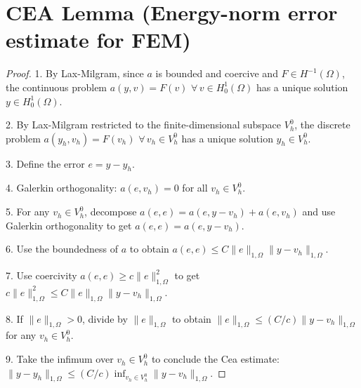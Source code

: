 \documentclass[12pt]{article}
\begin{document}
\section*{CEA Lemma (Energy-norm error estimate for FEM)}

\begin{proof}
1. By Lax-Milgram, since $a$ is bounded and coercive and $F \in H^{-1}(\Omega)$, the continuous problem $a(y, v) = F(v)$ $\forall\, v \in H^1_0(\Omega)$ has a unique solution $y \in H^1_0(\Omega)$.

2. By Lax-Milgram restricted to the finite-dimensional subspace $V^0_h$, the discrete problem $a(y_h, v_h) = F(v_h)$ $\forall\, v_h \in V^0_h$ has a unique solution $y_h \in V^0_h$.

3. Define the error $e = y - y_h$.

4. Galerkin orthogonality: $a(e, v_h) = 0$ for all $v_h \in V^0_h$.

5. For any $v_h \in V^0_h$, decompose $a(e, e) = a(e, y - v_h) + a(e, v_h)$ and use Galerkin orthogonality to get $a(e, e) = a(e, y - v_h)$.

6. Use the boundedness of $a$ to obtain $a(e, e) \le C \|e\|_{1,\Omega} \|y - v_h\|_{1,\Omega}$.

7. Use coercivity $a(e, e) \ge c \|e\|_{1,\Omega}^2$ to get $c \|e\|_{1,\Omega}^2 \le C \|e\|_{1,\Omega} \|y - v_h\|_{1,\Omega}$.

8. If $\|e\|_{1,\Omega} > 0$, divide by $\|e\|_{1,\Omega}$ to obtain $\|e\|_{1,\Omega} \le (C/c) \|y - v_h\|_{1,\Omega}$ for any $v_h \in V^0_h$.

9. Take the infimum over $v_h \in V^0_h$ to conclude the Cea estimate: $\|y - y_h\|_{1,\Omega} \le (C/c) \inf_{v_h \in V^0_h} \|y - v_h\|_{1,\Omega}$.
\end{proof}
\end{document}

